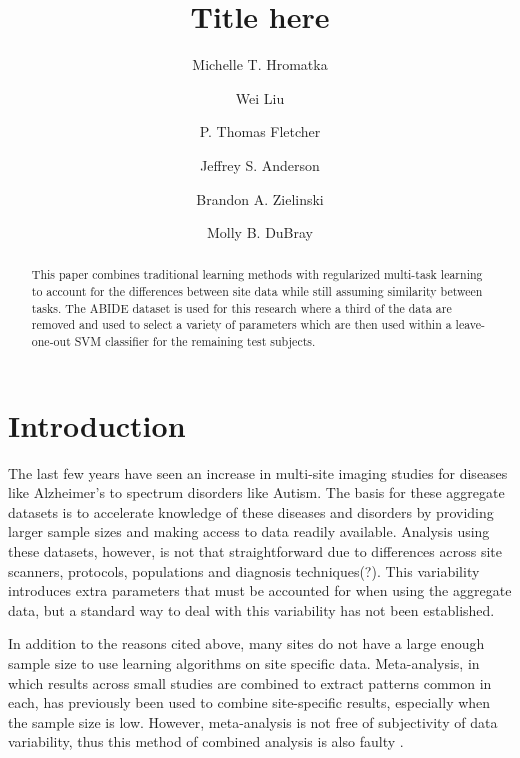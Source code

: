 \documentclass{llncs}
\begin{document}
\pagestyle{plain}

\mainmatter

\title{Title here}
%
%
\author{Michelle T. Hromatka \and Wei Liu \and P. Thomas Fletcher \and Jeffrey S. Anderson \and Brandon A. Zielinski \and Molly B. DuBray }


\maketitle

\begin{abstract}
 This paper combines traditional learning methods with regularized multi-task learning  to account for the differences between site data while still assuming similarity between tasks.  The ABIDE dataset is used for this research where a third of the data are removed and used to select a variety of parameters which are then used within a leave-one-out SVM classifier for the remaining test subjects. 
\end{abstract}

\section{Introduction}
The last few years have seen an increase in multi-site imaging studies for diseases like Alzheimer's to spectrum disorders like Autism. The basis for these aggregate datasets is to accelerate knowledge of these diseases and disorders by providing larger sample sizes and making access to data readily available.  Analysis using these datasets, however, is not that straightforward due to differences across site scanners, protocols, populations and diagnosis techniques(?). This variability introduces extra parameters that must be accounted for when using the aggregate data, but a standard way to deal with this variability has not been established.  

In addition to the reasons cited above, many sites do not have a large enough sample size to use learning algorithms on site specific data. 
Meta-analysis, in which results across small studies are combined to extract patterns common in each, has previously been used to combine site-specific results, especially when the sample size is low.  However, meta-analysis is not free of subjectivity of data variability, thus this method of combined analysis is also faulty \cite{meta}.
\end{document}
